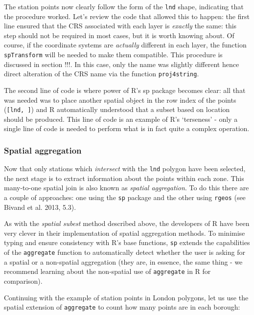 \documentclass[]{article}
\begin{document}
The station points now clearly follow the form of the \texttt{lnd}
shape, indicating that the procedure worked. Let's review the code that
allowed this to happen: the first line ensured that the CRS associated
with each layer is \emph{exactly} the same: this step should not be
required in most cases, but it is worth knowing about. Of course, if the
coordinate systems are \emph{actually} different in each layer, the
function \texttt{spTransform} will be needed to make them compatible.
This procedure is discussed in section !!!. In this case, only the name
was slightly different hence direct alteration of the CRS name via the
function \texttt{proj4string}.

The second line of code is where power of R's sp package becomes clear:
all that was needed was to place another spatial object in the row index
of the points (\texttt{{[}lnd, {]}}) and R automatically understood that
a subset based on location should be produced. This line of code is an
example of R's `terseness' - only a single line of code is needed to
perform what is in fact quite a complex operation.

\subsubsection{Spatial aggregation}

Now that only stations which \emph{intersect} with the \texttt{lnd}
polygon have been selected, the next stage is to extract information
about the points within each zone. This many-to-one spatial join is also
known as \emph{spatial aggregation}. To do this there are a couple of
approaches: one using the \texttt{sp} package and the other using
\texttt{rgeos} (see Bivand et al. 2013, 5.3).

As with the \emph{spatial subest} method described above, the developers
of R have been very clever in their implementation of spatial
aggregation methods. To minimise typing and ensure consistency with R's
base functions, \texttt{sp} extends the capabilities of the
\texttt{aggregate} function to automatically detect whether the user is
asking for a spatial or a non-spatial aggregation (they are, in essence,
the same thing - we recommend learning about the non-spatial use of
\texttt{aggregate} in R for comparison).

Continuing with the example of station points in London polygons, let us
use the spatial extension of \texttt{aggregate} to count how many points
are in each borough:
\end{document}
